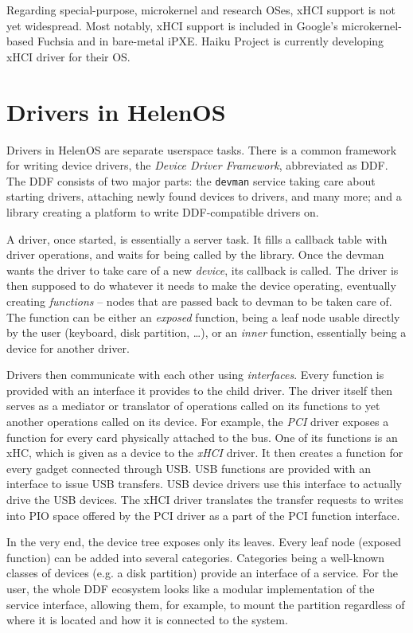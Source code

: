 Regarding special-purpose, microkernel and research OSes, xHCI support is not
yet widespread.  Most notably, xHCI support is included in Google's
microkernel-based Fuchsia and in bare-metal iPXE.  Haiku Project is currently
developing xHCI driver for their OS.

\section{Drivers in HelenOS}

Drivers in HelenOS are separate userspace tasks. There is a common framework
for writing device drivers, the \emph{Device Driver Framework}, abbreviated as
DDF. The DDF consists of two major parts: the \texttt{devman} service taking
care about starting drivers, attaching newly found devices to drivers, and many
more; and a  library creating a platform to write DDF-compatible
drivers on.

A driver, once started, is essentially a server task. It fills a callback table
with driver operations, and waits for being called by the library. Once the
devman wants the driver to take care of a new \emph{device}, its
 callback is called. The driver is then supposed to do whatever
it needs to make the device operating, eventually creating \emph{functions} --
nodes that are passed back to devman to be taken care of. The function can be
either an \emph{exposed} function, being a leaf node usable directly by the user
(keyboard, disk partition, \dots), or an \emph{inner} function, essentially
being a device for another driver.

Drivers then communicate with each other using \emph{interfaces}. Every
function is provided with an interface it provides to the child driver. The
driver itself then serves as a mediator or translator of operations called on
its functions to yet another operations called on its device. For example, the
\emph{PCI} driver exposes a function for every card physically attached to the
bus. One of its functions is an xHC, which is given as a device to the
\emph{xHCI} driver. It then creates a function for every gadget connected
through USB. USB functions are provided with an interface to issue USB
transfers. USB device drivers use this interface to actually drive the USB
devices. The xHCI driver translates the transfer requests to writes into PIO
space offered by the PCI driver as a part of the PCI function interface.

In the very end, the device tree exposes only its leaves. Every leaf node
(exposed function) can be added into several categories. Categories being
a well-known classes of devices (e.g. a disk partition) provide an interface
of a service. For the user, the whole DDF ecosystem looks like a modular
implementation of the service interface, allowing them, for example, to mount
the partition regardless of where it is located and how it is connected to the
system.

